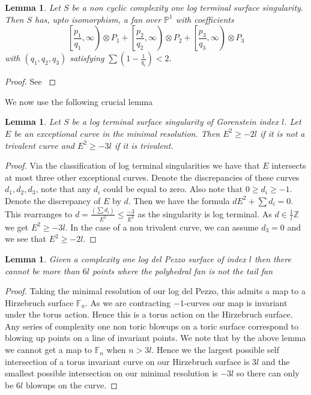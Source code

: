 \documentclass[12pt]{amsart}
\theoremstyle{plain}
\newtheorem{lem}[thm]{Lemma}
\begin{document}
\begin{lem}{\cite{Suss}}
Let $S$ be a non cyclic complexity one log terminal surface singularity. Then $S$ has, upto isomorphism, a fan over $\mathbb{P}^1$ with coefficients
\[
\left[\frac{p_1}{q_1}, \infty \right) \otimes P_1 + \left[ \frac{p_2}{q_2}, \infty \right) \otimes P_2 + \left[ \frac{p_3}{q_3}, \infty \right) \otimes P_3
\]
with $(q_1, q_2, q_3)$ satisfying $\sum(1 - \frac{1}{q_i}) < 2$.
\end{lem}
\begin{proof}
See \cite{Suss}
\end{proof}
We now use the following crucial lemma
\begin{lem}{\label{trivalent}}
Let $S$ be a log terminal surface singularity of Gorenstein index $l$. Let $E$ be an exceptional curve in the minimal resolution. Then $E^2 \geq -2l$ if it is not a trivalent curve and $E^2 \geq -3l$ if it is trivalent.
\end{lem}
\begin{proof}
Via the classification of log terminal singularities \cite{Br} we have that $E$ intersects at most three other exceptional curves. Denote the discrepancies of these curves $d_1, d_2, d_3$, note that any $d_i$ could be equal to zero. Also note that $0 \geq d_i \geq -1$. Denote the discrepancy of $E$ by $d$. Then we have the formula $dE^2 + \sum d_i = 0$.   This rearranges to $d = \frac{(\sum d_i)}{E^2} \leq \frac{-3}{E^2}$ as the singularity is log terminal. As $d \in \frac{1}{l} \mathbb{Z}$ we get $E^2 \geq -3l$. In the case of a non trivalent curve, we can assume $d_3 = 0$ and we see that $E^2 \geq -2l$.
\end{proof}



\begin{lem}
Given a complexity one log del Pezzo surface of index $l$ then there cannot be more than $6l$ points where the polyhedral fan is not the tail fan
\end{lem}
\begin{proof}
Taking the minimal resolution of our log del Pezzo, this admits a map to a Hirzebruch surface $\mathbb{F}_n$. As we are contracting $-1$-curves our map is invariant under the torus action. Hence this is a torus action on the Hirzebruch surface. Any series of complexity one non toric blowups on a toric surface correspond to blowing up points on a line of invariant points. We note that by the above lemma we cannot get a map to $\mathbb{F}_n$ when $n > 3l$. Hence we the largest possible self intersection of a torus invariant curve on our Hirzebruch surface is $3l$ and the smallest possible intersection on our minimal resolution is $-3l$ so there can only be $6l$ blowups on the curve.
\end{proof}
\end{document}
